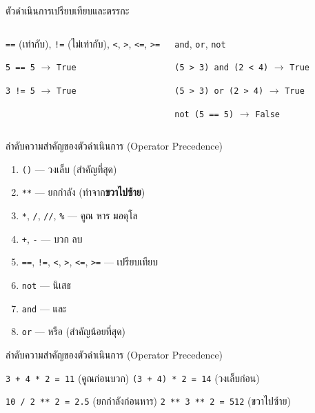 \documentclass[11pt, aspectratio=169]{beamer}
\newcommand{\py}[1]{\texttt{#1}}
\begin{document}
\begin{frame}{ตัวดำเนินการเปรียบเทียบและตรรกะ}
  \begin{columns}[T]
      \begin{explanation}[Comparison]
        \py{==} (เท่ากับ), \py{!=} (ไม่เท่ากับ), \py{<}, \py{>}, \py{<=}, \py{>=}
        \medskip

        \py{5 == 5} $\rightarrow$ \py{True}

        \py{3 != 5} $\rightarrow$ \py{True}
      \end{explanation}
      \begin{explanation}[Logical]
        \py{and}, \py{or}, \py{not}
        \medskip

        \py{(5 > 3) and (2 < 4)} $\rightarrow$ \py{True}

        \py{(5 > 3) or (2 > 4)} $\rightarrow$ \py{True}

        \py{not (5 == 5)} $\rightarrow$ \py{False}
      \end{explanation}
  \end{columns}
\end{frame}

\begin{frame}{ลำดับความสำคัญของตัวดำเนินการ (Operator Precedence)}
  \begin{explanation}
    \begin{enumerate}
      \item \py{()} — วงเล็บ (สำคัญที่สุด)
      \item \py{**} — ยกกำลัง (ทำจาก\textbf{ขวาไปซ้าย})
      \item \py{*}, \py{/}, \py{//}, \py{\%} — คูณ หาร มอดุโล
      \item \py{+}, \py{-} — บวก ลบ
      \item \py{==}, \py{!=}, \py{<}, \py{>}, \py{<=}, \py{>=} — เปรียบเทียบ
      \item \py{not} — นิเสธ
      \item \py{and} — และ
      \item \py{or} — หรือ (สำคัญน้อยที่สุด)
    \end{enumerate}
  \end{explanation}
\end{frame}

\begin{frame}{ลำดับความสำคัญของตัวดำเนินการ (Operator Precedence)}
  \begin{exambox}[ตัวอย่าง]
    \py{3 + 4 * 2 = 11} (คูณก่อนบวก) \qquad
    \py{(3 + 4) * 2 = 14} (วงเล็บก่อน)

    \py{10 / 2 ** 2 = 2.5} (ยกกำลังก่อนหาร) \qquad
    \py{2 ** 3 ** 2 = 512} (ขวาไปซ้าย)
  \end{exambox}
\end{frame}
\end{document}
